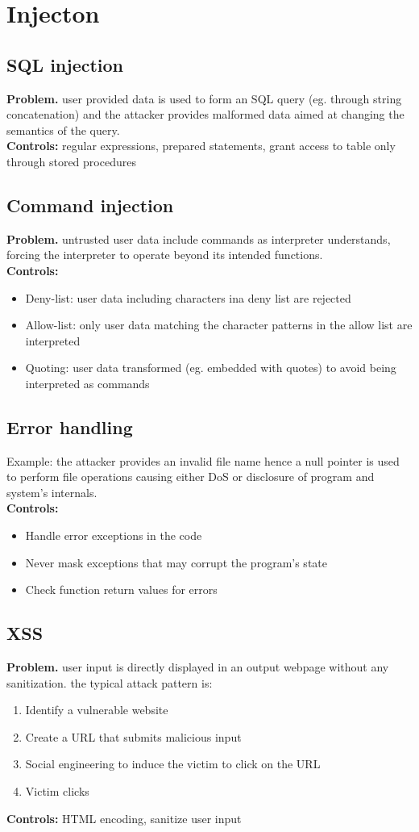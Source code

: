 \documentclass[10pt,a4paper]{book}
\begin{document}
\section{Injecton}
\subsection{SQL injection}
\textbf{Problem.} user provided data is used to form an SQL query (eg. through string concatenation) and the attacker provides malformed data aimed at changing the semantics of the query.\\
\textbf{Controls:} regular expressions, prepared statements, grant access to table only through stored procedures
\subsection{Command injection}
\textbf{Problem.} untrusted user data include commands as interpreter understands, forcing the interpreter to operate beyond its intended functions.\\
\textbf{Controls:}
\begin{itemize}
\item Deny-list: user data including characters ina deny list are rejected
\item Allow-list: only user data matching the character patterns in the allow list are interpreted
\item Quoting: user data transformed (eg. embedded with quotes) to avoid being interpreted as commands
\end{itemize}
\subsection{Error handling}
Example: the attacker provides an invalid file name hence a null pointer is used to perform file operations causing either DoS or disclosure of program and system's internals.\\
\textbf{Controls:}
\begin{itemize}
\item Handle error exceptions in the code
\item Never mask exceptions that may corrupt the program's state
\item Check function return values for errors
\end{itemize}
\subsection{XSS}
\textbf{Problem.} user input is directly displayed in an output webpage without any sanitization. the typical attack pattern is:
\begin{enumerate}
\item Identify a vulnerable website
\item Create a URL that submits malicious input
\item Social engineering to induce the victim to click on the URL
\item Victim clicks
\end{enumerate}
\textbf{Controls:} HTML encoding, sanitize user input
\end{document}
